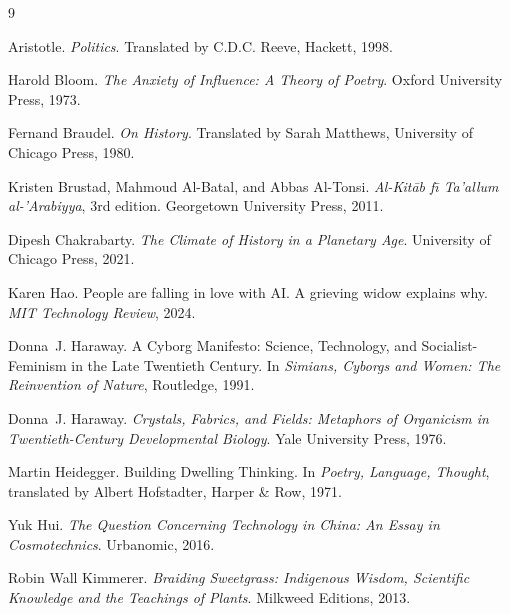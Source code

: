 \documentclass[12pt,a4paper]{article}
\begin{document}

\begin{thebibliography}{9}

Aristotle.
\newblock \emph{Politics}.
\newblock Translated by C.D.C. Reeve, Hackett, 1998.

Harold Bloom.
\newblock \emph{The Anxiety of Influence: A Theory of Poetry}.
\newblock Oxford University Press, 1973.

Fernand Braudel.
\newblock \emph{On History}.
\newblock Translated by Sarah Matthews, University of Chicago Press, 1980.

Kristen Brustad, Mahmoud Al-Batal, and Abbas Al-Tonsi.
\newblock \emph{Al-Kit\={a}b f\={\i} Ta'allum al-'Arabiyya}, 3rd edition.
\newblock Georgetown University Press, 2011.

Dipesh Chakrabarty.
\newblock \emph{The Climate of History in a Planetary Age}.
\newblock University of Chicago Press, 2021.

Karen Hao.
\newblock People are falling in love with AI\@. A grieving widow explains why.
\newblock \emph{MIT Technology Review}, 2024.

Donna~J. Haraway.
\newblock A Cyborg Manifesto: Science, Technology, and Socialist-Feminism in the Late Twentieth Century.
\newblock In \emph{Simians, Cyborgs and Women: The Reinvention of Nature}, Routledge, 1991.

Donna~J. Haraway.
\newblock \emph{Crystals, Fabrics, and Fields: Metaphors of Organicism in Twentieth-Century Developmental Biology}.
\newblock Yale University Press, 1976.

Martin Heidegger.
\newblock Building Dwelling Thinking.
\newblock In \emph{Poetry, Language, Thought}, translated by Albert Hofstadter, Harper \& Row, 1971.

Yuk Hui.
\newblock \emph{The Question Concerning Technology in China: An Essay in Cosmotechnics}.
\newblock Urbanomic, 2016.

Robin Wall Kimmerer.
\newblock \emph{Braiding Sweetgrass: Indigenous Wisdom, Scientific Knowledge and the Teachings of Plants}.
\newblock Milkweed Editions, 2013.

\end{thebibliography}
\end{document}
